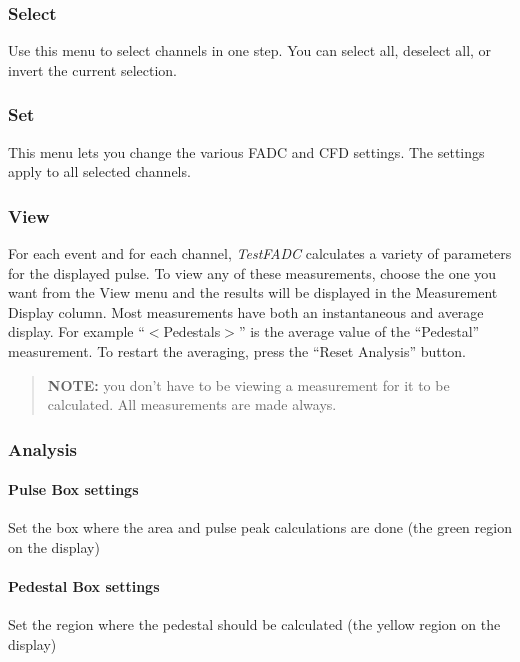 \documentclass{article}
\newcommand{\testfadc}{\emph{TestFADC} }
\begin{document}
\subsubsection{Select}

Use this menu to select channels in one step.  You can select all,
deselect all, or invert the current selection.

\subsubsection{Set}

This menu lets you change the various FADC and CFD settings.  The
settings apply to all selected channels.

\subsubsection{View}

For each event  and for each channel, \testfadc calculates a variety
of parameters for the displayed pulse. To view any of these
measurements, choose the one you want from the View menu and the
results will be displayed in the Measurement Display column. Most
measurements have both an instantaneous and average display.  For
example ``$<$Pedestals$>$'' is the average value of the ``Pedestal''
measurement. To restart the averaging, press the ``Reset Analysis'' button.

\begin{quote}
  \textbf{NOTE:} you don't have to be viewing a measurement for it to
  be calculated.  All measurements are made always.
\end{quote}


\subsubsection{Analysis}
\paragraph{Pulse Box settings}
Set the box where the area and pulse peak calculations are
done (the green region on the display)

\paragraph{Pedestal Box settings}
Set the region where the pedestal should be calculated (the yellow
region on the display)
\end{document}

